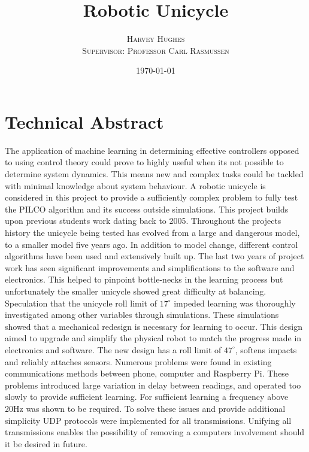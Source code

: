 \documentclass[twoside,twocolumn,12pt]{article}
\title{Robotic Unicycle} %
\author{%
\textsc{Harvey Hughes} \\
\textsc{Supervisor: Professor Carl Rasmussen} \\
}
\date{\today} %
\begin{document}
\onecolumn


\maketitle


\section*{Technical Abstract}
The application of machine learning in determining effective controllers opposed to using control theory could prove to highly useful when its not possible to determine system dynamics. This means new and complex tasks could be tackled with minimal knowledge about system behaviour.  A robotic unicycle is considered in this project to provide a sufficiently complex problem to fully test the PILCO algorithm and its success outside simulations.
\newline
\newline
This project builds upon previous students work dating back to 2005. Throughout the projects history the unicycle being tested has evolved from a large and dangerous model, to a smaller model five years ago. In addition to model change, different control algorithms have been used and extensively built up. 
\newline
\newline
The last two years of project work has seen significant improvements and simplifications to the software and electronics. This helped to pinpoint bottle-necks in the learning process but unfortunately the smaller unicycle showed great difficulty at balancing.
\newline
\newline
Speculation that the unicycle roll limit of $17^{\circ}$ impeded learning was thoroughly investigated among other variables through simulations. These simulations showed that a mechanical redesign is necessary for learning to occur. This design aimed to upgrade and simplify the physical robot to match the progress made in electronics and software. The new design has a roll limit of $47^{\circ}$, softens impacts and reliably attaches sensors. 
\newline
\newline
Numerous problems were found in existing communications methods between phone, computer and Raspberry Pi. These problems introduced large variation in delay between readings, and operated too slowly to provide sufficient learning. For sufficient learning a frequency above 20Hz was shown to be required. To solve these issues and provide additional simplicity UDP protocols were implemented for all transmissions. Unifying all transmissions enables the possibility of removing a computers involvement should it be desired in future.
\end{document}
